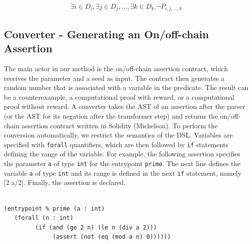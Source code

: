 \documentclass[runningheads]{llncs}
\begin{document}
\begin{gather}
  \label{eq:2}
\exists i \in D_{i},  \exists j \in D_{j},  ..., \exists k \in D_{k}. \neg P_{i, j, ...,k}
\end{gather}




\subsection{Converter - Generating an On/off-chain Assertion} The main actor in our method is the on/off-chain assertion contract, which receives the parameter and a seed as input. The contract then generates a random number that is associated with a variable in the predicate. The result can be a counterexample, a computational proof with reward, or a computational proof without reward. A converter takes the AST of an assertion after the parser (or the AST for its negation after the transformer step) and returns the on/off-chain assertion contract written in Solidity (Michelson). To perform the conversion automatically, we restrict the semantics of the DSL. Variables are specified with \texttt{forall} quantifiers, which are then followed by \texttt{if} statements defining the range of the variable. For example, the following assertion specifies the parameter \texttt{a} of type \texttt{int} for the entrypoint \texttt{prime}. The next line defines the variable \texttt{a} of type \texttt{int} and its range is defined in the next \texttt{if} statement, namely [2 a/2]. Finally, the assertion is declared.

\begin{lstlisting}[numbers=none]

(entrypoint % prime (a : int)
   (forall (n : int)
         (if (and (ge 2 n) (le n (div a 2)))
              (assert (not (eq (mod a n) 0))))))
             
\end{lstlisting}
\end{document}
